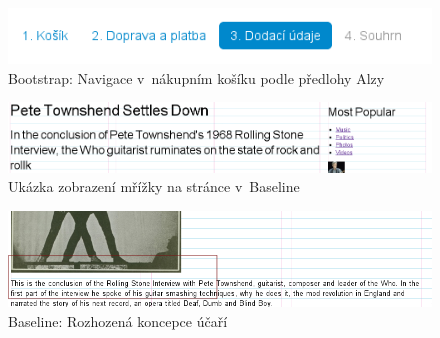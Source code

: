 \documentclass[thesis=B,czech]{FITthesis}[2012/06/26]
\begin{document}
\begin{figure}[htb]
	\begin{center}
	\includegraphics[scale=1]{images/image00.png}
	\end{center}
	\caption{Bootstrap: Navigace v~nákupním košíku podle předlohy Alzy}
	\label{imgNav}
\end{figure}

\begin{figure}[h]
	\begin{center}
	\includegraphics[scale=0.5]{images/image14.png}
	\end{center}
	\caption{Ukázka zobrazení mřížky na stránce v~Baseline}
	\label{imgBa3}
\end{figure}

\begin{figure}[h]
	\begin{center}
	\includegraphics[scale=0.7]{images/image03.png}
	\end{center}
	\caption{Baseline: Rozhozená koncepce účaří}
	\label{imgBa4}
\end{figure}
\end{document}
